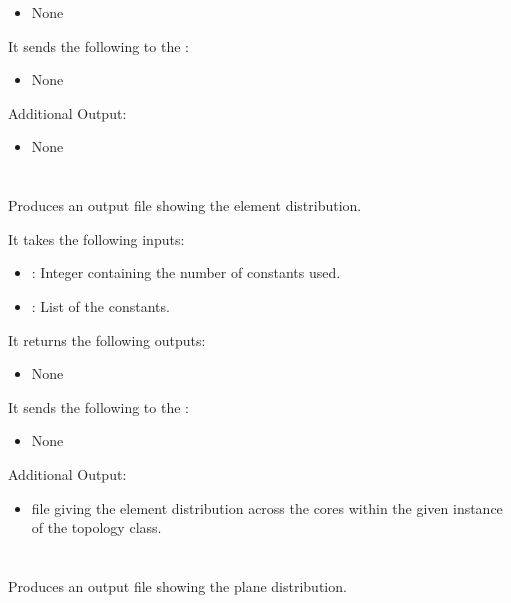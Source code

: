 \begin{itemize}
\item None
\end{itemize}

It sends the following to the :

\begin{itemize}
\item None
\end{itemize}

Additional Output:
\begin{itemize}
\item None
\end{itemize}


\section{}
Produces an output file showing the element distribution.

It takes the following inputs:

\begin{itemize}
\item {}:  Integer containing the number of constants used.
\item {}: List of the constants.
\end{itemize}

It returns the following outputs:

\begin{itemize}
\item None
\end{itemize}

It sends the following to the :

\begin{itemize}
\item None
\end{itemize}

Additional Output:
\begin{itemize}
\item {} file giving the element distribution across the cores within the given instance of the topology class. 
\end{itemize}


\section{}
Produces an output file showing the plane distribution.

